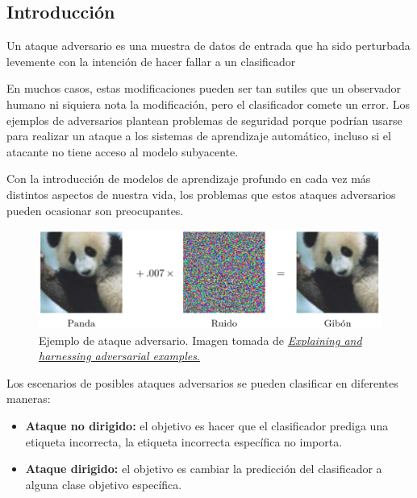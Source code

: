 \documentclass[10pt]{article}
\begin{document}
\begin{multicols*}{2}

\section{Introducción}

Un ataque adversario es una muestra de datos de entrada que ha sido perturbada
levemente con la intención de hacer fallar a un clasificador

En muchos casos, estas modificaciones pueden ser tan sutiles que un observador humano ni siquiera nota la modificación, pero el clasificador comete un error. Los ejemplos de adversarios plantean problemas de seguridad porque podrían usarse para realizar un ataque a los sistemas de aprendizaje automático, incluso si el atacante no tiene acceso al modelo subyacente.

Con la introducción de modelos de aprendizaje profundo en cada vez más distintos aspectos de nuestra vida, los problemas que estos ataques adversarios pueden ocasionar
son preocupantes.

\begin{figure}[H]
\centering
\includegraphics[width=0.99\linewidth]{Images/ejemplo1_anotado.png}
\caption{Ejemplo de ataque adversario. Imagen tomada de \href{https://arxiv.org/pdf/1412.6572.pdf}{\emph{Explaining and harnessing adversarial examples}.}}
\end{figure}

Los escenarios de posibles ataques adversarios se pueden clasificar en diferentes maneras:

\begin{itemize}
\item \textbf{Ataque no dirigido:} el objetivo es hacer que el clasificador prediga una etiqueta incorrecta, la etiqueta incorrecta específica no importa.

\item \textbf{Ataque dirigido:} el objetivo es cambiar la predicción del clasificador a alguna clase objetivo específica.
\end{itemize}


\end{multicols*}
\end{document}
